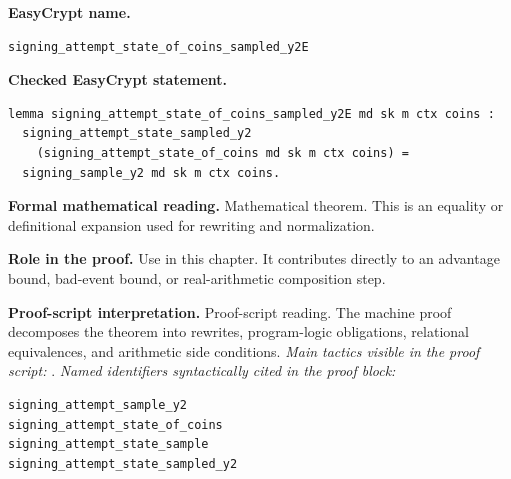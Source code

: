 \begin{formaltheorem}
\noindent\textbf{EasyCrypt name.}
\begin{lstlisting}[language=EasyCrypt,basicstyle=\ttfamily\scriptsize]
signing_attempt_state_of_coins_sampled_y2E
\end{lstlisting}
\noindent\textbf{Checked EasyCrypt statement.}
\begin{lstlisting}[language=EasyCrypt,basicstyle=\ttfamily\scriptsize]
lemma signing_attempt_state_of_coins_sampled_y2E md sk m ctx coins :
  signing_attempt_state_sampled_y2
    (signing_attempt_state_of_coins md sk m ctx coins) =
  signing_sample_y2 md sk m ctx coins.
\end{lstlisting}
\noindent\textbf{Formal mathematical reading.}
Mathematical theorem. This is an equality or definitional expansion used for rewriting and normalization.

\noindent\textbf{Role in the proof.}
Use in this chapter. It contributes directly to an advantage bound, bad-event bound, or real-arithmetic composition step.

\noindent\textbf{Proof-script interpretation.}
Proof-script reading. The machine proof decomposes the theorem into rewrites, program-logic obligations, relational equivalences, and arithmetic side conditions.
\emph{Main tactics visible in the proof script:} .
\emph{Named identifiers syntactically cited in the proof block:}
\begin{lstlisting}[language=EasyCrypt,basicstyle=\ttfamily\scriptsize]
signing_attempt_sample_y2
signing_attempt_state_of_coins
signing_attempt_state_sample
signing_attempt_state_sampled_y2
\end{lstlisting}

\end{formaltheorem}

